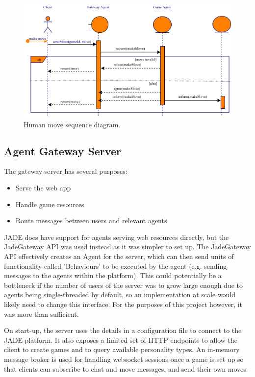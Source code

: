 \documentclass[conference]{IEEEtran}
\begin{document}
\begin{figure}[!h]
	\centering
	\includegraphics[width=\linewidth]{images/humanmove}
	\caption{Human move sequence diagram.}
	\label{fig:humanmove}
\end{figure}

\subsection{Agent Gateway Server}

The gateway server has several purposes: 
\begin{itemize}
	\item{Serve the web app}
	\item{Handle game resources}
	\item{Route messages between users and relevant agents}
\end{itemize}

JADE does have support for agents serving web resources directly, but the JadeGateway API was used instead as it was simpler to set up. The JadeGateway API effectively creates an Agent for the server, which can then send units of functionality called 'Behaviours' to be executed by the agent (e.g. sending messages to the agents within the platform). This could potentially be a bottleneck if the number of users of the server was to grow large enough due to agents being single-threaded by default, so an implementation at scale would likely need to change this interface. For the purposes of this project however, it was more than sufficient.

On start-up, the server uses the details in a configuration file to connect to the JADE platform. It also exposes a limited set of HTTP endpoints to allow the client to create games and to query available personality types. An in-memory message broker is used for handling websocket sessions once a game is set up so that clients can subscribe to chat and move messages, and send their own moves. 
\end{document}
